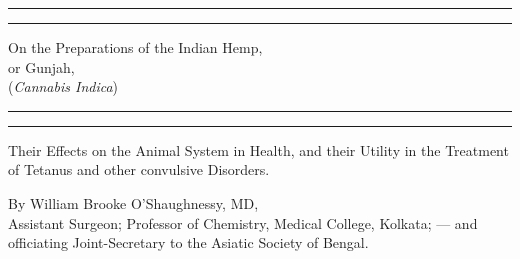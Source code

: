 \documentclass[a4paper, 11pt, oneside, polutonikogreek, english]{article}
\begin{document}
\begin{titlepage} %
	\centering %
	\scshape %

	
	\rule{\textwidth}{1.6pt}\vspace*{-\baselineskip}\vspace*{2pt} %
	\rule{\textwidth}{0.4pt} %
	
	\vspace{0.75\baselineskip} %

        {\LARGE On the Preparations of the Indian Hemp,\\ or Gunjah,\\ (\emph{Cannabis Indica})} %
	
	\vspace{0.75\baselineskip} %
	
	\rule{\textwidth}{0.4pt}\vspace*{-\baselineskip}\vspace{3.2pt} %
	\rule{\textwidth}{1.6pt} %
	
	\vspace{1\baselineskip} %
	
	
	{Their Effects on the Animal System in Health, and their Utility in the Treatment of Tetanus and other convulsive Disorders.} %
	
	\vspace*{1\baselineskip} %
	
	
	\vspace{1\baselineskip} %

        {By \Large William Brooke O'Shaughnessy, MD,\\\small Assistant Surgeon; Professor of Chemistry, Medical College, Kolkata; --- and officiating Joint-Secretary to the Asiatic Society of Bengal.}


\end{titlepage}
\end{document}

